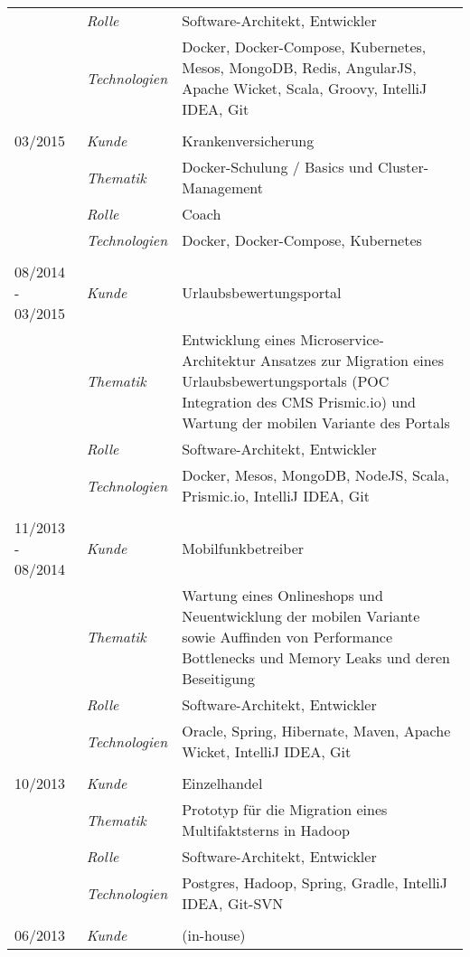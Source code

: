 \begin{longtable}{@{}>{}p{4cm}>{\itshape}p{2cm}>{}p{9cm}}
\nopagebreak		& Rolle 	    & Software-Architekt, Entwickler\\
\nopagebreak		& Technologien	& Docker, Docker-Compose, Kubernetes, Mesos, MongoDB, Redis, AngularJS, Apache Wicket, Scala, Groovy, IntelliJ IDEA, Git\\
\\
03/2015             & Kunde 	    & Krankenversicherung\\
\nopagebreak		& Thematik	    & Docker-Schulung / Basics und Cluster-Management\\
\nopagebreak		& Rolle 	    & Coach\\
\nopagebreak		& Technologien	& Docker, Docker-Compose, Kubernetes\\
\\
08/2014 - 03/2015     & Kunde 	    & Urlaubsbewertungsportal\\
\nopagebreak		& Thematik	    & Entwicklung eines Microservice-Architektur Ansatzes zur Migration eines Urlaubsbewertungsportals (POC Integration des CMS Prismic.io) und Wartung der mobilen Variante des Portals\\
\nopagebreak		& Rolle 	    & Software-Architekt, Entwickler\\
\nopagebreak		& Technologien	& Docker, Mesos, MongoDB, NodeJS, Scala, Prismic.io, IntelliJ IDEA, Git\\
\\
11/2013 - 08/2014     & Kunde 	    & Mobilfunkbetreiber\\
\nopagebreak		& Thematik	    & Wartung eines Onlineshops und Neuentwicklung der mobilen Variante sowie Auffinden von Performance Bottlenecks und Memory Leaks und deren Beseitigung\\
\nopagebreak		& Rolle 	    & Software-Architekt, Entwickler\\
\nopagebreak		& Technologien	& Oracle, Spring, Hibernate, Maven, Apache Wicket, IntelliJ IDEA, Git\\
\\
10/2013             & Kunde 	    & Einzelhandel\\
\nopagebreak		& Thematik	    & Prototyp für die Migration eines Multifaktsterns in Hadoop\\
\nopagebreak		& Rolle 	    & Software-Architekt, Entwickler\\
\nopagebreak		& Technologien	& Postgres, Hadoop, Spring, Gradle, IntelliJ IDEA, Git-SVN\\
\\
06/2013             & Kunde 	    & (in-house)\\

\end{longtable}
